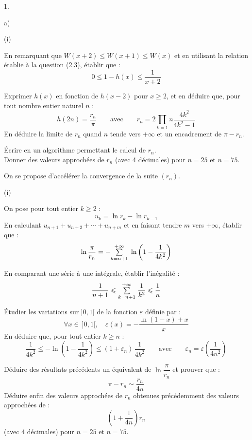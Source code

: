\documentclass[11pt]{article}%
\begin{document}
\begin{noliste}{1.}
\begin{noliste}{a)}
\begin{nonoliste}{(i)}
\item En remarquant que $W(x + 2)\leq W(x + 1)\leq W(x)$ et en
utilisant la relation établie à la question (2.3), établir que : 
\[
0\leq 1-h(x)\leq \dfrac{1}{x + 2}
\]

\item Exprimer $h(x)$ en fonction de $h(x-2)$ pour $x\geq 2$, et en
déduire que, pour tout nombre entier naturel $n$ : 
\[
h(2n) = \dfrac{r_{n}}{\pi }\qquad \text{avec}\qquad r_{n} = 2\prod_{k =
1}{n}\dfrac{4k^{2}}{4k^{2}-1}
\]
En déduire la limite de $r_{n}$ quand $n$ tende vers $ + \infty $ et un
encadrement de $\pi -r_{n}$.

\item Écrire en \Scilab{} un algorithme permettant le calcul de
$r_{n}$.\\
Donner des valeurs approchées de $r_{n}$ (avec 4 décimales) pour $n =
25$ et $n = 75$.
\end{nonoliste}

\item On se propose d'accélérer la convergence de la suite $(r_{n})$.

\begin{nonoliste}{(i)}
\item On pose pour tout entier $k\geq 2$ : 
\[
u_{k} = \ln r_{k}-\ln r_{k-1}
\]
En calculant $u_{n + 1} + u_{n + 2} + \cdots + u_{n + m}$ et en faisant
tendre $m$ vers 
$ + \infty $, établir que : 
\[
\ln \dfrac{\pi }{r_{n}} = -{\textstyle\sum\limits_{k = n + 1}^{+ \infty }}\hspace{.1cm}\ln \left(
1-\dfrac{1}{4k^{2}}\right)
\]

\item En comparant une série à une intégrale, établir l'inégalité : 
\[
\dfrac{1}{n + 1}\leqslant {\textstyle\sum\limits_{k = n + 1}^{+ \infty }}\hspace{.1cm}\dfrac{1}{k^{2}}\leqslant 
\dfrac{1}{n}
\]

\item Étudier les variations sur $]0,1[$ de la fonction $\varepsilon $
définie par : 
\[
\forall x\in \ ]0,1[,\quad \varepsilon (x) = -\dfrac{\ln (1-x) + x}{x}
\]
En déduire que, pour tout entier $k\geq n$ : 
\[
\dfrac{1}{4k^{2}}\leq -\ln \left( 1-\dfrac{1}{4k^{2}}\right) \leq
(1 + \varepsilon_{n})\,\dfrac{1}{4k^{2}}\qquad \text{avec}\qquad
\varepsilon
_{n} = \varepsilon \left( \dfrac{1}{4n^{2}}\right)
\]

\item Déduire des résultats précédents un équivalent de $\ln \dfrac{\pi
}{r_{n}}$ et prouver que : 
\[
\pi -r_{n}\sim \dfrac{r_{n}}{4n}
\]
Déduire enfin des valeurs approchées de $r_{n}$ obtenues précédemment
des
valeurs approchées de : 
\[
\left( 1 + \dfrac{1}{4n}\right) r_{n}
\]
(avec 4 décimales) pour $n = 25$ et $n = 75$.
\end{nonoliste}
\end{noliste}
\end{noliste}

\label{fin}
\end{document}
